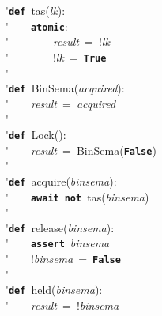 \'\>\texttt{\textbf{def}}~tas(\textit{lk}):\\

\'\>~~~~\texttt{\textbf{atomic}}:\\

\'\>~~~~~~~~\textit{result}~=~!\textit{lk}\\

\'\>~~~~~~~~!\textit{lk}~=~\texttt{\textbf{True}}\\

\'\>\\

\'\>\texttt{\textbf{def}}~BinSema(\textit{acquired}):\\

\'\>~~~~\textit{result}~=~\textit{acquired}\\

\'\>\\

\'\>\texttt{\textbf{def}}~Lock():\\

\'\>~~~~\textit{result}~=~BinSema(\texttt{\textbf{False}})\\

\'\>\\

\'\>\texttt{\textbf{def}}~acquire(\textit{binsema}):\\

\'\>~~~~\texttt{\textbf{await}}~\texttt{\textbf{not}}~tas(\textit{binsema})\\

\'\>\\

\'\>\texttt{\textbf{def}}~release(\textit{binsema}):\\

\'\>~~~~\texttt{\textbf{assert}}~\textit{binsema}\\

\'\>~~~~!\textit{binsema}~=~\texttt{\textbf{False}}\\

\'\>\\

\'\>\texttt{\textbf{def}}~held(\textit{binsema}):\\

\'\>~~~~\textit{result}~=~!\textit{binsema}